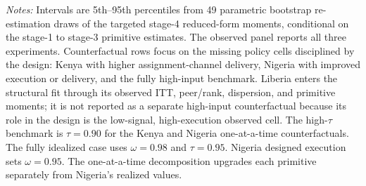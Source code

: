 \begin{table}[H]
\begin{threeparttable}
\begin{tablenotes}
\item \textit{Notes:} Intervals are 5th--95th percentiles from 49 parametric bootstrap re-estimation draws of the targeted stage-4 reduced-form moments, conditional on the stage-1 to stage-3 primitive estimates. The observed panel reports all three experiments. Counterfactual rows focus on the missing policy cells disciplined by the design: Kenya with higher assignment-channel delivery, Nigeria with improved execution or delivery, and the fully high-input benchmark. Liberia enters the structural fit through its observed ITT, peer/rank, dispersion, and primitive moments; it is not reported as a separate high-input counterfactual because its role in the design is the low-signal, high-execution observed cell. The high-$\tau$ benchmark is $\tau = 0.90$ for the Kenya and Nigeria one-at-a-time counterfactuals. The fully idealized case uses $\omega = 0.98$ and $\tau = 0.95$. Nigeria designed execution sets $\omega = 0.95$. The one-at-a-time decomposition upgrades each primitive separately from Nigeria's realized values.
\end{tablenotes}
\end{threeparttable}
\end{table}
